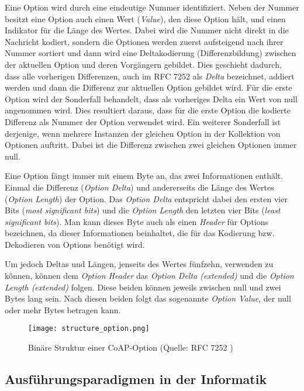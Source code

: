 Eine Option wird durch eine eindeutige Nummer identifiziert. Neben der Nummer besitzt eine Option auch einen Wert (\textit{Value}), den diese Option hält, und einen Indikator für die Länge des Wertes. Dabei wird die Nummer nicht direkt in die Nachricht kodiert, sondern die Optionen werden zuerst aufsteigend nach ihrer Nummer sortiert und dann wird eine Deltakodierung (Differenzbildung) zwischen der aktuellen Option und deren Vorgängern gebildet. Dies geschieht dadurch, dass alle vorherigen Differenzen, auch im RFC 7252 \autocite{RFC7252} als \textit{Delta} bezeichnet, addiert werden und dann die Differenz zur aktuellen Option gebildet wird. Für die erste Option wird der Sonderfall behandelt, dass als vorheriges Delta ein Wert von null angenommen wird. Dies resultiert daraus, dass für die erste Option die kodierte Differenz als Nummer der Option verwendet wird. Ein weiterer Sonderfall ist derjenige, wenn mehrere Instanzen der gleichen Option in der Kollektion von Optionen auftritt. Dabei ist die Differenz zwischen zwei gleichen Optionen immer null.

Eine Option fängt immer mit einem Byte an, das zwei Informationen enthält. Einmal die Differenz (\textit{Option Delta}) und andererseits die Länge des Wertes (\textit{Option Length}) der Option. Das \textit{Option Delta} entspricht dabei den ersten vier Bits (\textit{most significant bits}) und die \textit{Option Length} den letzten vier Bits (\textit{least significant bits}). Man kann dieses Byte auch als einen \textit{Header} für Options bezeichnen, da dieser Informationen beinhaltet, die für das Kodierung bzw. Dekodieren von Options benötigt wird.

Um jedoch Deltas und Längen, jenseits des Wertes fünfzehn, verwenden zu können, können dem \textit{Option Header} das \textit{Option Delta (extended)} und die \textit{Option Length (extended)} folgen. Diese beiden können jeweils zwischen null und zwei Bytes lang sein. Nach diesen beiden folgt das sogenannte \textit{Option Value}, der null oder mehr Bytes betragen kann.

\begin{figure}[h]
    \centering
    \texttt{[image: structure\_option.png]}
    \caption{Binäre Struktur einer CoAP-Option (Quelle: RFC 7252 \autocite{RFC7252})}
    \label{fig:binaere-sturktur-einer-coap-option}
\end{figure}

\subsection{Ausführungsparadigmen in der Informatik}
\label{subsubsec:ausfuehrungsparadigmen-in-der-informatik}

